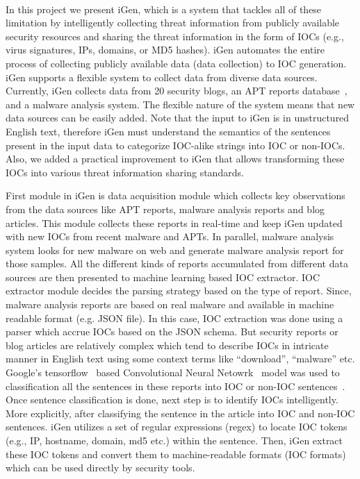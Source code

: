 \paragraph{} %
In this project we present iGen, which is a system that tackles all of these limitation by intelligently collecting threat information from publicly available security resources and sharing the threat information in the form of IOCs (e.g., virus signatures, IPs, domains, or MD5 hashes). iGen automates the entire process of collecting publicly available data (data collection) to IOC generation. iGen supports a flexible system to collect data from diverse data sources. Currently, iGen collects data from 20 security blogs, an APT reports database~\cite{apt}, and a malware analysis system. The flexible nature of the system means that new data sources can be easily added. Note that the input to iGen is in unstructured English text, therefore iGen must understand the semantics of the sentences present in the input data to categorize IOC-alike strings into IOC or non-IOCs. Also, we added a practical improvement to iGen that allows transforming these IOCs into various threat information sharing standards.

First module in iGen is data acquisition module which collects key observations from the data sources like APT reports, malware analysis reports and blog articles. This module collects these reports in real-time and keep iGen updated with new IOCs from recent malware and APTs. In parallel, malware analysis system looks for new malware on web and generate malware analysis report for those samples.   All the different kinds of reports accumulated from different data sources are then presented to machine learning based IOC extractor. IOC extractor module decides the parsing strategy based on the type of report. Since, malware analysis reports are based on real malware and available in machine readable format (e.g. JSON file). In this case, IOC extraction was done using a parser which accrue IOCs based on the JSON schema. But security reports or blog articles are relatively complex which tend to describe IOCs in intricate manner in English text using some context terms like ``download'', ``malware'' etc. Google's tensorflow~\cite{abadi} based Convolutional Neural Netowrk~\cite{krizhevsky} model was used to classification all the sentences in these reports into IOC or non-IOC sentences~\cite{bengio,yih,mikolov,collobert}. Once sentence classification is done, next step is to identify IOCs intelligently. More explicitly, after classifying the sentence in the article into IOC and non-IOC sentences. iGen utilizes a set of regular expressions (regex) to locate IOC tokens (e.g., IP, hostname, domain, md5 etc.) within the sentence. Then, iGen extract these IOC tokens and convert them to machine-readable formats (IOC formats) which can be used directly by security tools.

